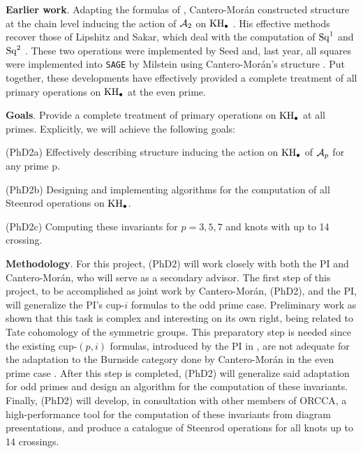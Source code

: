 \medskip\noindent\textbf{Earlier work}.
Adapting the formulas of \cite{medina2023fast_sq}, Cantero-Mor\'an constructed structure at the chain level inducing the action of $\mathcal{A}_2$ on $\mathrm{KH}_\bullet$ \cite{cantero-moran2020khovanov}.
His effective methods recover those of Lipshitz and Sakar, which deal with the computation of $\operatorname{Sq}^1$ and $\operatorname{Sq}^2$ \cite{lipshitz2014steenrod}.
These two operations were implemented by Seed \cite{seed2012khovanov} and, last year, all squares were implemented into \texttt{SAGE} by Milstein using Cantero-Morán's structure \cite{milstein2022khovanov}.
Put together, these developments have effectively provided a complete treatment of all primary operations on $\mathrm{KH}_\bullet$ at the even prime.

\medskip\noindent\textbf{Goals}.
Provide a complete treatment of primary operations on $\mathrm{KH}_\bullet$ at all primes.
Explicitly, we will achieve the following goals:

\smallskip\noindent(PhD2a)
Effectively describing structure inducing the action on $\mathrm{KH}_\bullet$ of $\mathcal{A}_p$ for any prime p.\par
\smallskip\noindent(PhD2b)
Designing and implementing algorithms for the computation of all Steenrod operations on $\mathrm{KH}_\bullet$.\par
\smallskip\noindent(PhD2c)
Computing these invariants for $p=3,5,7$ and knots with up to 14 crossing.


\smallskip\noindent\textbf{Methodology}.
For this project, (PhD2) will work closely with both the PI and Cantero-Morán, who will serve as a secondary advisor.
The first step of this project, to be accomplished as joint work by Cantero-Mor\'an, (PhD2), and the PI, will generalize the PI's cup-$i$ formulas \cite{medina2023oddcartan} to the odd prime case.
Preliminary work as shown that this task is complex and interesting on its own right, being related to Tate cohomology of the symmetric groups.
This preparatory step is needed since the existing cup-$(p,i)$ formulas, introduced by the PI in \cite{medina2021may_st}, are not adequate for the adaptation to the Burnside category done by Cantero-Mor\'an in the even prime case \cite{cantero-moran2020khovanov}.
After this step is completed, (PhD2) will generalize said adaptation for odd primes and design an algorithm for the computation of these invariants.
Finally, (PhD2) will develop, in consultation with other members of ORCCA, a high-performance tool for the computation of these invariants from diagram presentations, and produce a catalogue of Steenrod operations for all knots up to 14 crossings.
